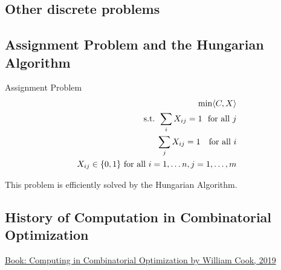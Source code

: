 
\subsection{Other discrete problems}
\subsection{Assignment Problem and the Hungarian Algorithm}
\begin{general}{Assignment Problem}{\polynomial}
\begin{equation}
\begin{split}
\min \langle C, X\rangle\\
\mbox{ s.t. }  \sum_{i} X_{ij} = 1 \ \mbox{ for all } j\\
\sum_j X_{ij} = 1 \ \ \mbox{ for all } i\\
X_{ij} \in \{0,1\} \mbox{ for all } i=1, \dots n,  j=1, \dots, m
\end{split}
\end{equation}
\end{general}

This problem is efficiently solved by the Hungarian Algorithm.


\subsection{History of Computation in Combinatorial Optimization}


\href{https://link.springer.com/chapter/10.1007/978-3-319-91908-9_3}{Book: Computing in Combinatorial Optimization by William Cook, 2019}